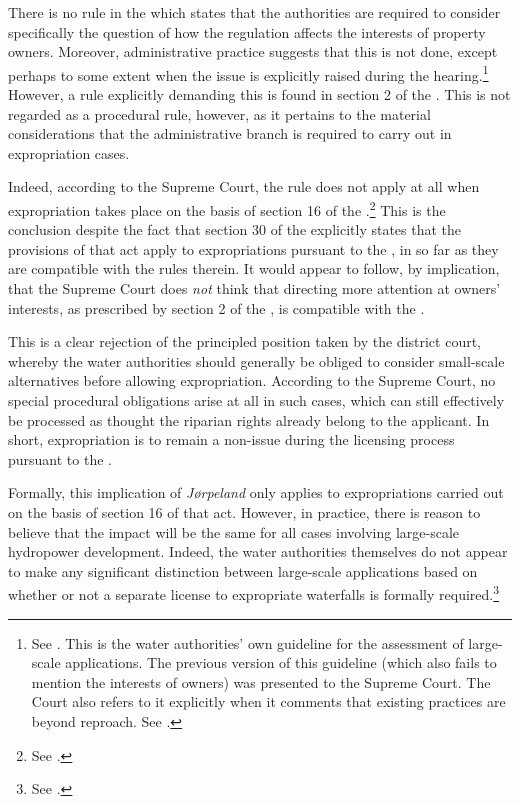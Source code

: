 There is no rule in the \cite{wra17} which states that the authorities are required to consider specifically the question of how the regulation affects the interests of property owners. Moreover, administrative practice suggests that this is not done, except perhaps to some extent when the issue is explicitly raised during the hearing.\footnote{See \cite{stokker10}. This is the water authorities' own guideline for the assessment of large-scale applications. The previous version of this guideline (which also fails to mention the interests of owners) was presented to the Supreme Court. The Court also refers to it explicitly when it comments that existing practices are beyond reproach. See \cite[51]{jorpeland11}.} However, a rule explicitly demanding this is found in section 2 of the \cite{ea59}. This is not regarded as a procedural rule, however, as it pertains to the material considerations that the administrative branch is required to carry out in expropriation cases. 

Indeed, according to the Supreme Court, the rule does not apply at all when expropriation takes place on the basis of section 16 of the \cite{wra17}.\footnote{See \cite[30]{jorpeland11}.} This is the conclusion despite the fact that section 30 of the \cite{ea59} explicitly states that the provisions of that act apply to expropriations pursuant to the \cite{wra17}, in so far as they are compatible with the rules therein. It would appear to follow, by implication, that the Supreme Court does {\it not} think that directing more attention at owners' interests, as prescribed by section 2 of the \cite{ea59}, is compatible with the \cite{wra17}. 

This is a clear rejection of the principled position taken by the district court, whereby the water authorities should generally be obliged to consider small-scale alternatives before allowing expropriation. According to the Supreme Court, no special procedural obligations arise at all in such cases, which can still effectively be processed as thought the riparian rights already belong to the applicant. In short, expropriation is to remain a non-issue during the licensing process pursuant to the \cite{wra17}. 

Formally, this implication of {\it Jørpeland} only applies to expropriations carried out on the basis of section 16 of that act. However, in practice, there is reason to believe that the impact will be the same for all cases involving large-scale hydropower development. Indeed, the water authorities themselves do not appear to make any significant distinction between large-scale applications based on whether or not a separate license to expropriate waterfalls is formally required.\footnote{See \cite{flatby08}.}

